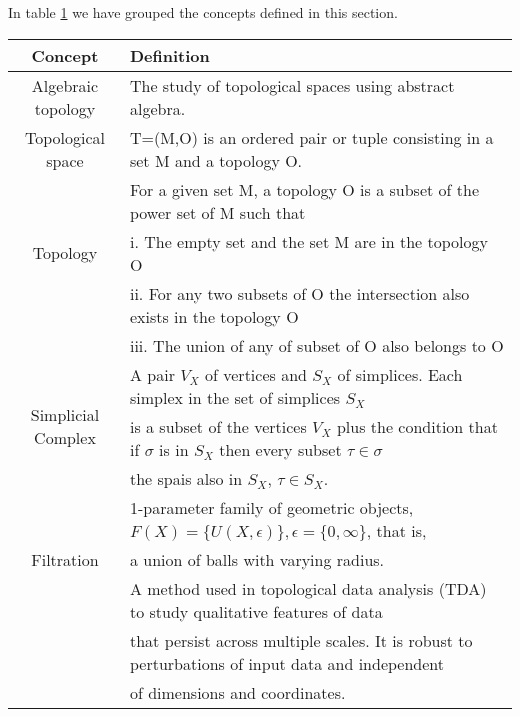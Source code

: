\documentclass[onecollarge,runningheads]{svjour2}
\begin{document}

In table \ref{table:table} we have grouped the concepts defined in this section.
\begin{table}[htbp]
\begin{center}
\begin{tabular}{|c|l|}
\hline
 Concept & Definition\\ 
\hline
  Algebraic topology & The study of topological spaces using abstract algebra.\\ 

 \hline
   Topological space & {T=(M,O) is an ordered pair or tuple consisting in a set M and a topology O.}\\ 

 \hline

 \multirow{3}{*}{Topology}
 & {For a given set M, a topology O is a subset of the power set of M such that} \\
 & {i. The empty set and the set M are in the topology O }  \\
 & {ii. For any two subsets of O the intersection also exists in the topology O } \\
 & {iii. The union of any of subset of O also belongs to O} \\
 \hline
\multirow{3}{*}{Simplicial Complex}
 & {A pair $V_X$ of vertices and $S_X$ of simplices. Each simplex in the set of simplices $S_X$ }  \\
 & {is a subset of the vertices $V_X$ plus the condition that if $\sigma$ is in $S_X$ then every subset $\tau \in \sigma$ }  \\
 & the spais also in $S_X$, $\tau \in S_X$.\\
 \hline
  \multirow{3}{*}{Filtration}
 & {1-parameter family of geometric objects, $F(X) = \{U(X, \epsilon)\}, \epsilon = \{ 0, \infty\}$, that is, }  \\
 & {a union of balls with varying radius.}  \\
 \hline\multirow{3}{*}{Persistent Homology}
 & {A method used in topological data analysis (TDA) to study qualitative features of data }  \\
 & {that persist across multiple scales. It is robust to perturbations of input data and  independent}  \\
 & {of dimensions and coordinates.} \\
 \hline
\end{tabular}
\label{table:table}
\end{center}
\end{table}
\end{document}
